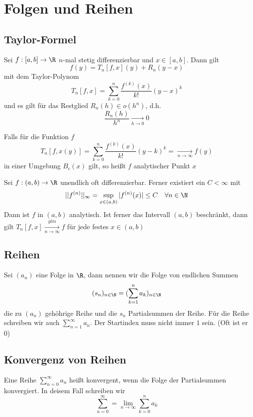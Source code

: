 \section{Folgen und Reihen}
	\subsection{Taylor-Formel}
		\begin{Satz} [ ]
			Sei $f:[a, b]\to\R$ $n$-mal stetig differenzierbar und $x\in[a, b]$. Dann gilt
			$$
				f(y)=T_n[f, x](y)+R_n(y-x)
			$$
			mit dem Taylor-Polynom
			$$
				T_n[f, x]=\displaystyle\sum_{k=0}^n\frac{f^{(k)}(x)}{k!}(y-x)^k
			$$
			und es gilt für das Restglied $R_n(h)\in o(h^n)$, d.h.
			$$
				\frac{R_n(h)}{h^n}\xrightarrow[h\to0]{}0
			$$
		\end{Satz}
		\begin{Definition} 
			Falls für die Funktion $f$
			$$
				T_n[f, x(y)]=\displaystyle\sum_{k=0}^n \frac{f^{(k)}(x)}{k!}(y-k)^k=\xrightarrow[n\to\infty]{}f(y)
			$$
			in einer Umgebung $B_\epsilon(x)$ gilt, so heißt $f$ analytischer Punkt $x$
		\end{Definition}
		\begin{Satz} [ ]
			Sei $f:(a, b)\to\R$ unendlich oft differenzierbar. Ferner existiert ein $C<\infty$ mit 
			$$
				||f^{(n)}||_\infty=\sup_{x\in(a, b)}|f^{(n)}(x)|\leq C \quad \forall n \in \N
			$$
			Dann ist $f$ in $(a, b)$ analytisch. Ist ferner das Intervall $(a, b)$ beschränkt, dann gilt $T_n[f, x]\xrightarrow[n\to\infty]{glm}f$ für jede festes $x\in(a, b)$
		\end{Satz}
	\subsection{Reihen}
		\begin{Definition} [ Reihe]
			Sei $(a_n)$ eine Folge in $\R$, dann nennen wir die Folge von endlichen Summen
			$$
				(s_n)_{n\in\N}=(\displaystyle\sum_{k=1}^na_k)_{n\in\N}
			$$
			die zu $(a_n)$ gehöhrige Reihe und die $s_n$ Partialsummen der Reihe. Für die Reihe schreiben wir auch $\displaystyle\sum_{n=1}^\infty a_n$. Der Startindex muss nicht immer $1$ sein. (Oft ist er $0$)
		\end{Definition}
	\subsection{Konvergenz von Reihen}
		\begin{Definition} 
			Eine Reihe $\displaystyle\sum_{n=0}^\infty a_n$ heißt konvergent, wenn die Folge der Partialsummen konvergiert. In deisem Fall schreiben wir
		$$
			\displaystyle\sum_{n=0}^\infty=\lim_{n\to\infty}\displaystyle\sum_{k=0}^na_k
		$$
		\end{Definition}
